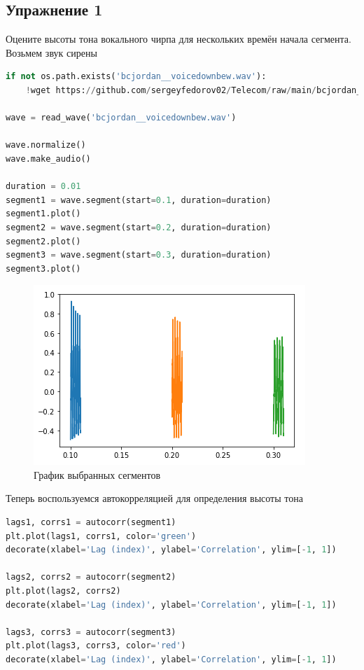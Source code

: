 \subsection{Упражнение 1}

Оцените высоты тона вокального чирпа для нескольких времён начала сегмента. Возьмем звук сирены

\begin{lstlisting}[language=Python]
if not os.path.exists('bcjordan__voicedownbew.wav'):
    !wget https://github.com/sergeyfedorov02/Telecom/raw/main/bcjordan__voicedownbew.wav

wave = read_wave('bcjordan__voicedownbew.wav')

wave.normalize()
wave.make_audio()

duration = 0.01
segment1 = wave.segment(start=0.1, duration=duration)
segment1.plot()
segment2 = wave.segment(start=0.2, duration=duration)
segment2.plot()
segment3 = wave.segment(start=0.3, duration=duration)
segment3.plot()
\end{lstlisting}

\begin{figure}[H]
	\begin{center}
		\includegraphics[scale=1]{fig/lab05/lab05_01.png}
		\caption{График выбранных сегментов}
	\end{center}
\end{figure}

Теперь воспользуемся автокорреляцией для определения высоты тона

\begin{lstlisting}[language=Python]
lags1, corrs1 = autocorr(segment1)
plt.plot(lags1, corrs1, color='green')
decorate(xlabel='Lag (index)', ylabel='Correlation', ylim=[-1, 1])

lags2, corrs2 = autocorr(segment2)
plt.plot(lags2, corrs2)
decorate(xlabel='Lag (index)', ylabel='Correlation', ylim=[-1, 1])

lags3, corrs3 = autocorr(segment3)
plt.plot(lags3, corrs3, color='red')
decorate(xlabel='Lag (index)', ylabel='Correlation', ylim=[-1, 1])
\end{lstlisting}

